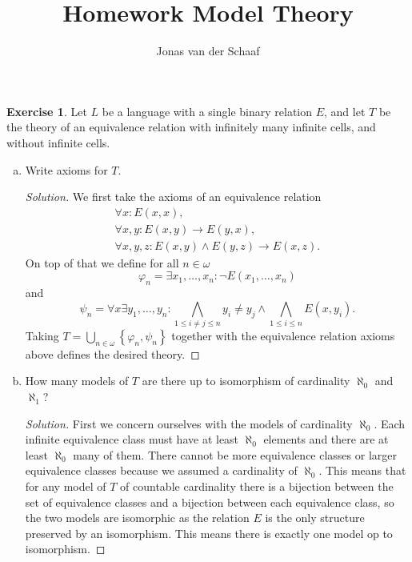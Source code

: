 \documentclass{article}
\title{Homework Model Theory}
\author{Jonas van der Schaaf}
\date{}
\renewcommand{\qedsymbol}{\raisebox{-0.5cm}{}}
\newcommand{\set}[1]{\left\{#1\right\}}
\newenvironment{solution}{\begin{proof}[Solution]\renewcommand\qedsymbol{}}{\end{proof}}
\theoremstyle{definition}
\newtheorem{question}{Exercise}
\begin{document}
\maketitle

\begin{question}
    Let \(L\) be a language with a single binary relation \(E\), and let \(T\)
    be the theory of an equivalence relation with infinitely many infinite
    cells, and without infinite cells.

    \begin{enumerate}[(a)]
        \item Write axioms for \(T\).

              \begin{solution}
                  We first take the axioms of an equivalence relation
                  \begin{gather*}
                      \forall x:E(x,x),\\
                      \forall x,y:E(x,y)\to E(y,x),\\
                      \forall x,y,z:E(x,y)\wedge E(y,z)\to E(x,z).
                  \end{gather*}
                  On top of that we define for all \(n\in\omega\)
                  \[
                      \varphi_{n}=\exists x_{1},\ldots,x_{n}:\neg E(x_{1},\ldots,x_{n})
                  \]
                  and
                  \[
                      \psi_{n}=\forall x\exists y_{1},\ldots,y_{n}:
                      \bigwedge_{1\leq i\neq j\leq n}y_{i}\neq y_{j}
                      \wedge\bigwedge_{1\leq i\leq n}E(x,y_{i}).
                  \]
                  Taking \(T=\bigcup_{n\in\omega}\set{\varphi_{n},\psi_{n}}\)
                  together with the equivalence relation axioms above defines
                  the desired theory.
              \end{solution}

        \item How many models of \(T\) are there up to isomorphism of
              cardinality \(\aleph_{0}\) and \(\aleph_{1}\)?

              \begin{solution}
                  First we concern ourselves with the models of cardinality
                  \(\aleph_{0}\). Each infinite equivalence class must have at
                  least \(\aleph_{0}\) elements and there are at least
                  \(\aleph_{0}\) many of them. There cannot be more equivalence
                  classes or larger equivalence classes because we assumed a
                  cardinality of \(\aleph_{0}\). This means that for any model
                  of \(T\) of countable cardinality there is a bijection between
                  the set of equivalence classes and a bijection between each
                  equivalence class, so the two models are isomorphic as the
                  relation \(E\) is the only structure preserved by an
                  isomorphism. This means there is exactly one model op to
                  isomorphism.


\end{solution}
\end{enumerate}
\end{question}
\end{document}
